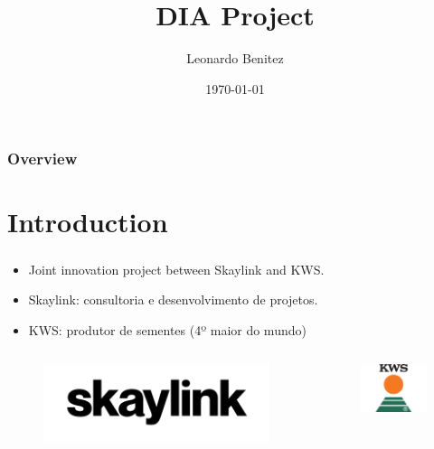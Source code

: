 \documentclass{beamer}
\title[DIA Project]{DIA Project}
\author{Leonardo Benitez}
\institute[Skaylink]{Skaylink \\
\medskip\textit{leonardo.benitez@skaylink.com}}
\date{\today} %
\begin{document}
\begin{frame}
\titlepage %
\end{frame}

\begin{frame}
\frametitle{Overview} %
\tableofcontents %
\end{frame}



\section{Introduction}
\begin{frame}
\centering \Huge {\secname}
\end{frame}

\begin{frame}
\frametitle{\secname}
\begin{itemize}
\item Joint innovation project between Skaylink and KWS.
\item Skaylink: consultoria e desenvolvimento de projetos.
\item KWS: produtor de sementes (4º maior do mundo)
\end{itemize}

\begin{center}
\begin{columns}[c]
\begin{figure}
\includegraphics[width=0.5\linewidth]{Imagens/skaylink.png}
\end{figure}

\begin{figure}
\includegraphics[width=0.3\linewidth]{Imagens/kws.png}
\end{figure}
\end{columns}\end{center}
\end{frame}
\end{document}
